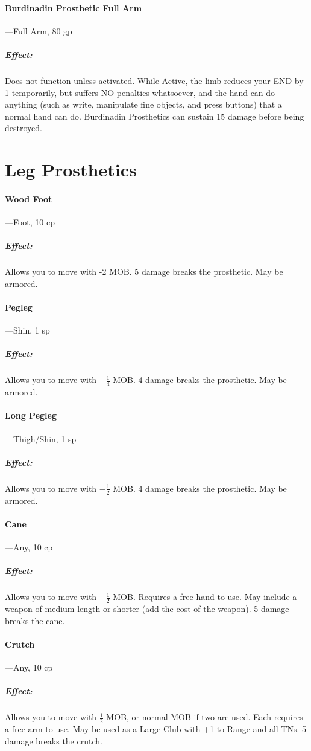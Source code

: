 \documentclass[oneside,11pt,english]{book}
\begin{document}
\paragraph{Burdinadin Prosthetic Full Arm}---\quad Full Arm, 80 gp
\vspace{-15pt} \subparagraph{Effect:} Does not function unless activated. While
Active, the limb reduces your END by 1 temporarily, but suffers NO penalties
whatsoever, and the hand can do anything (such as write, manipulate fine
objects, and press buttons) that a normal hand can do. Burdinadin Prosthetics
can sustain 15 damage before being destroyed. 

\section{Leg Prosthetics}
\paragraph{Wood Foot}---\quad Foot, 10 cp
\vspace{-15pt} \subparagraph{Effect:} Allows you to move with -2 MOB. 5 damage breaks the prosthetic. May be armored.
\paragraph{Pegleg}\label{par:Pegleg}
---\quad Shin, 1 sp
\vspace{-15pt} \subparagraph{Effect:} Allows you to move with $ -\frac{1}{4} $ MOB. 4 damage breaks the prosthetic. May be armored.
\paragraph{Long Pegleg}\label{par:Long Pegleg}
---\quad Thigh/Shin, 1 sp
\vspace{-15pt} \subparagraph{Effect:} Allows you to move with $ -\frac{1}{2} $ MOB. 4 damage breaks the prosthetic. May be armored.
\paragraph{Cane}---\quad Any, 10 cp
\vspace{-15pt} \subparagraph{Effect:} Allows you to move with $ -\frac{1}{2} $ MOB. Requires a free hand to use. May include a weapon of medium length or shorter (add the cost of the weapon). 5 damage breaks the cane.

\paragraph{Crutch}---\quad Any, 10 cp
\vspace{-15pt} \subparagraph{Effect:} Allows you to move with $ \frac{1}{2} $ MOB, or normal MOB if two are used. Each requires a free arm to use. May be used as a Large Club with +1 to Range and all TNs. 5 damage breaks the crutch.
\end{document}
